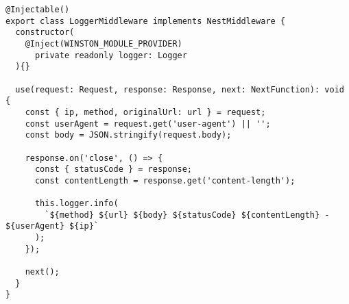 \begin{lstlisting}
@Injectable()
export class LoggerMiddleware implements NestMiddleware {
  constructor(
    @Inject(WINSTON_MODULE_PROVIDER)
      private readonly logger: Logger
  ){}

  use(request: Request, response: Response, next: NextFunction): void {
    const { ip, method, originalUrl: url } = request;
    const userAgent = request.get('user-agent') || '';
    const body = JSON.stringify(request.body);

    response.on('close', () => {
      const { statusCode } = response;
      const contentLength = response.get('content-length');

      this.logger.info(
        `${method} ${url} ${body} ${statusCode} ${contentLength} - ${userAgent} ${ip}`
      );
    });

    next();
  }
}
\end{lstlisting}

